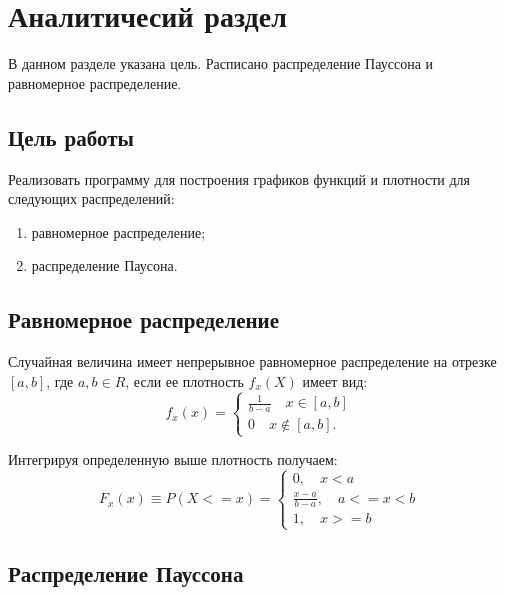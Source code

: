 \section{Аналитичесий раздел}
В данном разделе указана цель. 
Расписано распределение Пауссона и равномерное распределение.

\subsection{Цель работы}
Реализовать программу для построения графиков функций и плотности для следующих распределений:
\begin{enumerate}
	\item равномерное распределение;
	\item распределение Паусона.
\end{enumerate}

\subsection{Равномерное распределение}
Случайная величина имеет непрерывное равномерное распределение на отрезке $[a,b]$, где $a,b \in R $, если ее плотность $f_x(X)$ имеет вид:
\begin{equation}
f_x(x)=\begin{cases}
\frac{1}{b-a} \quad x \in [a,b] \\
0 \quad x \notin [a,b].
\end{cases}
\end{equation}

Интегрируя определенную выше плотность получаем:
\begin{equation}
F_x(x) \equiv P(X <= x) = \begin{cases}
	0, \quad x < a \\
	\frac{x - a}{b - a}, \quad a <= x < b \\
	1, \quad x >= b
\end{cases}
\end{equation}

\subsection{Распределение Пауссона}
